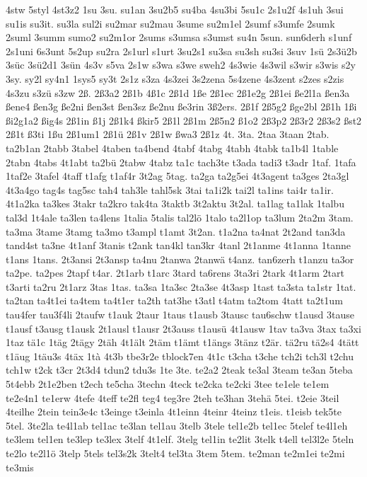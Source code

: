 {4stw
5styl
4st3z2
1su
3su.
su1an
3su2b5
su4ba
4su3bi
5su1c
2s1u2f
4s1uh
3sui
su1is
su3it.
su3la
sul2i
su2mar
su2mau
3sume
su2m1el
2sumf
s3umfe
2sumk
2suml
3summ
sumo2
su2m1or
2sums
s3umsa
s3umst
su4n
5sun.
sun6derh
s1unf
2s1uni
6s3unt
5s2up
su2ra
2s1url
s1urt
3su2s1
su3sa
su3sh
su3si
3suv
1sü
2s3ü2b
3süc
3sü2d1
3sün
4s3v
s5va
2s1w
s3wa
s3we
sweh2
4s3wie
4s3wil
s3wir
s3wis
s2y
3sy.
sy2l
sy4n1
1sys5
sy3t
2s1z
s3za
4s3zei
3s2zena
5s4zene
4s3zent
s2zes
s2zis
4s3zu
s3zü
s3zw
2ß.
2ß3a2
2ß1b
4ß1c
2ß1d
1ße
2ß1ec
2ß1e2g
2ß1ei
ße2l1a
ßen3a
ßene4
ßen3g
ße2ni
ßen3st
ßen3sz
ße2nu
ße3rin
3ß2ers.
2ß1f
2ß5g2
ßge2bl
2ß1h
1ßi
ßi2g1a2
ßig4s
2ß1in
ß1j
2ß1k4
ßkir5
2ß1l
2ß1m
2ß5n2
ß1o2
2ß3p2
2ß3r2
2ß3s2
ßst2
2ß1t
ß3ti
1ßu
2ß1um1
2ß1ü
2ß1v
2ß1w
ßwa3
2ß1z
4t.
3ta.
2taa
3taan
2tab.
ta2b1an
2tabb
3tabel
4taben
ta4bend
4tabf
4tabg
4tabh
4tabk
ta1b4l
1table
2tabn
4tabs
4t1abt
ta2bü
2tabw
4tabz
ta1c
tach3te
t3ada
tadi3
t3adr
1taf.
1tafa
1taf2e
3tafel
4taff
t1afg
t1af4r
3t2ag
5tag.
ta2ga
ta2g5ei
4t3agent
ta3ges
2ta3gl
4t3a4go
tag4s
tag5sc
tah4
tah3le
tahl5sk
3tai
ta1i2k
tai2l
ta1ins
tai4r
ta1ir.
4t1a2ka
ta3kes
3takr
ta2kro
tak4ta
3taktb
3t2aktu
3t2al.
ta1lag
ta1lak
1talbu
tal3d
1t4ale
ta3len
ta4lens
1talia
5talis
tal2lö
1talo
ta2l1op
ta3lum
2ta2m
3tam.
ta3ma
3tame
3tamg
ta3mo
t3ampl
t1amt
3t2an.
t1a2na
ta4nat
2t2and
tan3da
tand4st
ta3ne
4t1anf
3tanis
t2ank
tan4kl
tan3kr
4tanl
2t1anme
4t1anna
1tanne
t1ans
1tans.
2t3ansi
2t3ansp
ta4nu
2tanwa
2tanwä
t4anz.
tan6zerh
t1anzu
ta3or
ta2pe.
ta2pes
2tapf
t4ar.
2t1arb
t1arc
3tard
ta6rens
3ta3ri
2tark
4t1arm
2tart
t3arti
ta2ru
2t1arz
3tas
1tas.
ta3sa
1ta3sc
2ta3se
4t3asp
1tast
ta3sta
ta1str
1tat.
ta2tan
ta4t1ei
ta4tem
ta4t1er
ta2th
tat3he
t3atl
t4atm
ta2tom
4tatt
ta2t1um
tau4fer
tau3f4li
2taufw
t1auk
2taur
1taus
t1ausb
3tausc
tau6schw
t1ausd
3tause
t1ausf
t3ausg
t1ausk
2t1ausl
t1ausr
2t3auss
t1ausü
4t1ausw
1tav
ta3va
3tax
ta3xi
1taz
tä1c
1täg
2tägy
2täh
4t1ält
2täm
t1ämt
t1ängs
3tänz
t2är.
tä2ru
tä2s4
4tätt
t1äug
1täu3s
4täx
1tà
4t3b
tbe3r2e
tblock7en
4t1c
t3cha
t3che
tch2i
tch3l
t2chu
tch1w
t2ck
t3cr
2t3d4
tdun2
tdu3s
1te
3te.
te2a2
2teak
te3al
3team
te3an
5teba
5t4ebb
2t1e2ben
t2ech
te5cha
3techn
4teck
te2cka
te2cki
3tee
te1ele
te1em
te2e4n1
te1erw
4tefe
4teff
te2fl
teg4
teg3re
2teh
te3han
3tehä
5tei.
t2eie
3teil
4teilhe
2tein
tein3e4c
t3einge
t3einla
4t1einn
4teinr
4teinz
t1eis.
t1eisb
tek5te
5tel.
3te2la
te4l1ab
tel1ac
te3lan
tel1au
3telb
3tele
tel1e2b
tel1ec
5telef
te4l1eh
te3lem
tel1en
te3lep
te3lex
3telf
4t1elf.
3telg
tel1in
te2lit
3telk
t4ell
tel3l2e
5teln
te2lo
te2l1ö
3telp
5tels
tel3s2k
3telt4
tel3ta
3tem
5tem.
te2man
te2m1ei
te2mi
te3mis
}
